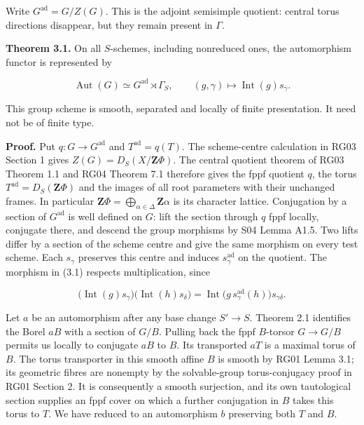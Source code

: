 \documentclass[11pt,a4paper,openany]{report}
\newcounter{none}
\begin{document}
Write \(G^{\mathrm{ad}}=G/Z(G)\). This is the adjoint semisimple quotient: central torus directions disappear, but they remain present in \(\Gamma\).

\textbf{Theorem 3.1.} On all \(S\)-schemes, including nonreduced ones, the automorphism functor is represented by

\[
\operatorname{Aut}(G)\simeq G^{\mathrm{ad}}\rtimes\Gamma_S,
\qquad (g,\gamma)\longmapsto\operatorname{Int}(g)s_\gamma.
\tag{3.1}
\]

This group scheme is smooth, separated and locally of finite presentation. It need not be of finite type.

\textbf{Proof.} Put \(q:G\to G^{\mathrm{ad}}\) and \(T^{\mathrm{ad}}=q(T)\). The scheme-centre calculation in RG03 Section 1 gives \(Z(G)=D_S(X/\mathbf Z\Phi)\). The central quotient theorem of RG03 Theorem 1.1 and RG04 Theorem 7.1 therefore gives the fppf quotient \(q\), the torus \(T^{\mathrm{ad}}=D_S(\mathbf Z\Phi)\) and the images of all root parameters with their unchanged frames. In particular \(\mathbf Z\Phi=\bigoplus_{\alpha\in\Delta}\mathbf Z\alpha\) is its character lattice. Conjugation by a section of \(G^{\mathrm{ad}}\) is well defined on \(G\): lift the section through \(q\) fppf locally, conjugate there, and descend the group morphisms by S04 Lemma A1.5. Two lifts differ by a section of the scheme centre and give the same morphism on every test scheme. Each \(s_\gamma\) preserves this centre and induces \(s_\gamma^{\mathrm{ad}}\) on the quotient. The morphism in (3.1) respects multiplication, since

\[
\bigl(\operatorname{Int}(g)s_\gamma\bigr)\bigl(\operatorname{Int}(h)s_\delta\bigr)
=\operatorname{Int}\bigl(g\,s_\gamma^{\mathrm{ad}}(h)\bigr)s_{\gamma\delta}.
\]

Let \(a\) be an automorphism after any base change \(S'\to S\). Theorem 2.1 identifies the Borel \(aB\) with a section of \(G/B\). Pulling back the fppf \(B\)-torsor \(G\to G/B\) permits us locally to conjugate \(aB\) to \(B\). Its transported \(aT\) is a maximal torus of \(B\). The torus transporter in this smooth affine \(B\) is smooth by RG01 Lemma 3.1; its geometric fibres are nonempty by the solvable-group torus-conjugacy proof in RG01 Section 2. It is consequently a smooth surjection, and its own tautological section supplies an fppf cover on which a further conjugation in \(B\) takes this torus to \(T\). We have reduced to an automorphism \(b\) preserving both \(T\) and \(B\).
\end{document}
